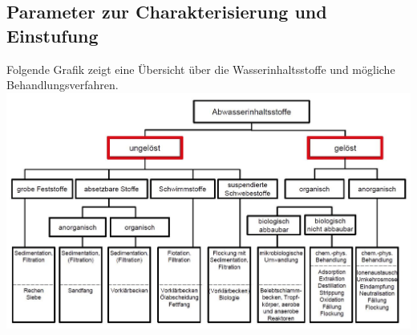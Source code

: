 \documentclass[9pt, openright=false]{scrartcl}
\begin{document}
\subsection{Parameter zur Charakterisierung und Einstufung}
Folgende Grafik zeigt eine Übersicht über die Wasserinhaltsstoffe und mögliche Behandlungsverfahren.\\
\includegraphics[width=\textwidth]{images/inhaltbehandlung}
\end{document}

